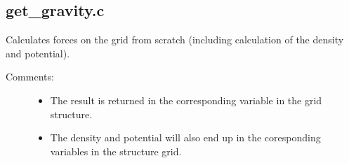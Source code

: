 \documentclass[letterpaper,10pt,english]{sphinxmanual}
\begin{document}

\begin{fulllineitems}
\label{\detokenize{sphinx-c-apidoc/output/gravity/get_forces_c:c.pow2}}%
\pysigstartmultiline
{}%
\pysigstopmultiline
\end{fulllineitems}



\subsection{get\_gravity.c}
\label{\detokenize{sphinx-c-apidoc/output/gravity/get_gravity_c:get-gravity-c}}\label{\detokenize{sphinx-c-apidoc/output/gravity/get_gravity_c::doc}}
Calculates forces on the grid from scratch (including calculation of the
density and potential).
\begin{description}
\item[{Comments:}] \leavevmode\begin{itemize}
\item {} 
The result is returned in the corresponding variable in the grid
structure.

\item {} 
The density and potential will also end up in the coresponding
variables in the structure grid.

\end{itemize}

\end{description}

\begin{fulllineitems}
\label{\detokenize{sphinx-c-apidoc/output/gravity/get_gravity_c:c.get_gravity}}%
\pysigstartmultiline
{}%
\pysigstopmultiline
\end{fulllineitems}
\end{document}
